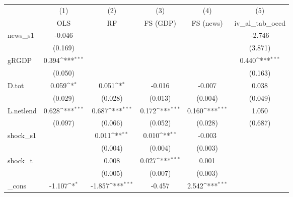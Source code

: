 {
\def\sym#1{\ifmmode^{#1}\else\(^{#1}\)\fi}
\begin{tabular}{l*{5}{c}}
\toprule
            &\multicolumn{1}{c}{(1)}&\multicolumn{1}{c}{(2)}&\multicolumn{1}{c}{(3)}&\multicolumn{1}{c}{(4)}&\multicolumn{1}{c}{(5)}\\
            &\multicolumn{1}{c}{OLS}&\multicolumn{1}{c}{RF}&\multicolumn{1}{c}{FS (GDP)}&\multicolumn{1}{c}{FS (news)}&\multicolumn{1}{c}{iv\_al\_tab\_oecd}\\
\midrule
news\_s1     &      -0.046         &                     &                     &                     &      -2.746         \\
            &     (0.169)         &                     &                     &                     &     (3.871)         \\
\addlinespace
gRGDP       &       0.394\sym{***}&                     &                     &                     &       0.440\sym{***}\\
            &     (0.050)         &                     &                     &                     &     (0.163)         \\
\addlinespace
D.tot       &       0.059\sym{*}  &       0.051\sym{*}  &      -0.016         &      -0.007         &       0.038         \\
            &     (0.029)         &     (0.028)         &     (0.013)         &     (0.004)         &     (0.049)         \\
\addlinespace
L.netlend   &       0.628\sym{***}&       0.687\sym{***}&       0.172\sym{***}&       0.160\sym{***}&       1.050         \\
            &     (0.097)         &     (0.066)         &     (0.052)         &     (0.028)         &     (0.687)         \\
\addlinespace
shock\_s1    &                     &       0.011\sym{**} &       0.010\sym{**} &      -0.003         &                     \\
            &                     &     (0.004)         &     (0.004)         &     (0.003)         &                     \\
\addlinespace
shock\_t     &                     &       0.008         &       0.027\sym{***}&       0.001         &                     \\
            &                     &     (0.005)         &     (0.007)         &     (0.003)         &                     \\
\addlinespace
\_cons      &      -1.107\sym{*}  &      -1.857\sym{***}&      -0.457         &       2.542\sym{***}&                     \\

\end{tabular}}
